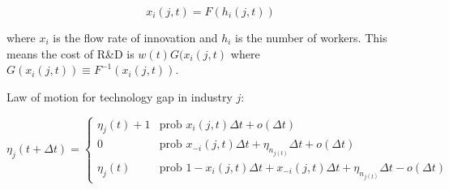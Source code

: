 \documentclass[11pt]{article}
\begin{document}
  \begin{equation} \label{eq:tech_rd_technology}
    x_i(j, t) = F(h_i(j, t))
  \end{equation}

  where $x_i$ is the flow rate of innovation and $h_i$ is the number of workers.  This means the cost of R\&D is $w(t)G(x_i(j,t)$ where $G(x_i(j,t)) \equiv F^{-1}(x_i(j,t))$.

  Law of motion for technology gap in industry $j$:

  \begin{equation} \label{eq:tech_law_of_motion}
    \eta_j(t + \Delta t) =
    \begin{cases}
      \eta_j(t) + 1 & \textrm{prob } x_i(j,t)\Delta t + o(\Delta t)\\
      0 & \textrm{prob } x_{-i}(j,t)\Delta t + \eta_{n_{j(t)}}\Delta t + o(\Delta t) \\
      \eta_j(t) & \textrm{prob } 1 - x_i(j,t)\Delta t + x_{-i}(j,t)\Delta t + \eta_{n_{j(t)}}\Delta t - o(\Delta t)
    \end{cases}
  \end{equation}
\end{document}
